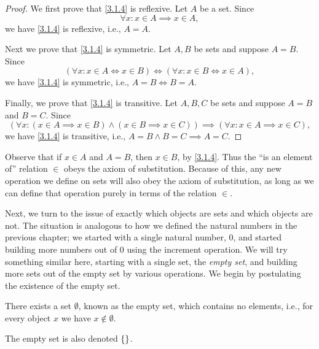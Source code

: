\begin{proof}
  We first prove that \cref{3.1.4} is reflexive.
  Let \(A\) be a set.
  Since
  \[
    \forall x : x \in A \implies x \in A,
  \]
  we have \cref{3.1.4} is reflexive, i.e., \(A = A\).

  Next we prove that \cref{3.1.4} is symmetric.
  Let \(A, B\) be sets and suppose \(A = B\).
  Since
  \[
    (\forall x : x \in A \iff x \in B) \iff (\forall x : x \in B \iff x \in A),
  \]
  we have \cref{3.1.4} is symmetric, i.e., \(A = B \iff B = A\).

  Finally, we prove that \cref{3.1.4} is transitive.
  Let \(A, B, C\) be sets and suppose \(A = B\) and \(B = C\).
  Since
  \[
    (\forall x : (x \in A \implies x \in B) \land (x \in B \implies x \in C)) \implies (\forall x : x \in A \implies x \in C),
  \]
  we have \cref{3.1.4} is transitive, i.e., \(A = B \land B = C \implies A = C\).
\end{proof}

\begin{note}
  Observe that if \(x \in A\) and \(A = B\), then \(x \in B\), by \cref{3.1.4}.
  Thus the ``is an element of'' relation \(\in\) obeys the axiom of substitution.
  Because of this, any new operation we define on sets will also obey the axiom of substitution, as long as we can define that operation purely in terms of the relation \(\in\).
\end{note}

\begin{note}
  Next, we turn to the issue of exactly which objects are sets and which objects are not.
  The situation is analogous to how we defined the natural numbers in the previous chapter;
  we started with a single natural number, \(0\), and started building more numbers out of \(0\) using the increment operation.
  We will try something similar here, starting with a single set, the \emph{empty set},
  and building more sets out of the empty set by various operations.
  We begin by postulating the existence of the empty set.
\end{note}

\begin{ax}\label{3.2}
  There exists a set \(\emptyset\), known as the empty set, which contains no elements, i.e., for every object \(x\) we have \(x \notin \emptyset\).
\end{ax}

\begin{note}
  The empty set is also denoted \(\left\lbrace\right\rbrace\).
\end{note}

